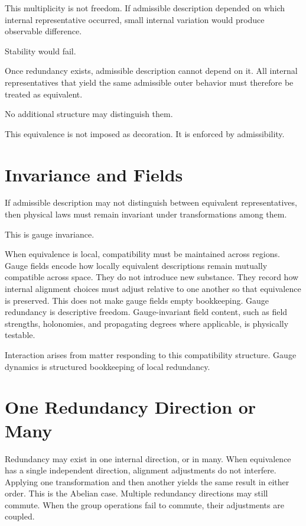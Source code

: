 \documentclass[11pt,twoside,openright]{book}
\begin{document}
This multiplicity is not freedom. If admissible description depended on which internal representative occurred, small internal variation would produce observable difference.

Stability would fail.

Once redundancy exists, admissible description cannot depend on it. All internal representatives that yield the same admissible outer behavior must therefore be treated as equivalent.

No additional structure may distinguish them.

This equivalence is not imposed as decoration. It is enforced by admissibility.

\section*{Invariance and Fields}

If admissible description may not distinguish between equivalent representatives, then physical laws must remain invariant under transformations among them.

This is gauge invariance.

When equivalence is local, compatibility must be maintained across regions. Gauge fields encode how locally equivalent descriptions remain mutually compatible across space. They do not introduce new substance. They record how internal alignment choices must adjust relative to one another so that equivalence is preserved. This does not make gauge fields empty bookkeeping. Gauge redundancy is descriptive freedom. Gauge-invariant field content, such as field strengths, holonomies, and propagating degrees where applicable, is physically testable.

Interaction arises from matter responding to this compatibility structure. Gauge dynamics is structured bookkeeping of local redundancy.

\section*{One Redundancy Direction or Many}

Redundancy may exist in one internal direction, or in many. When equivalence has a single independent direction, alignment adjustments do not interfere. Applying one transformation and then another yields the same result in either order. This is the Abelian case. Multiple redundancy directions may still commute. When the group operations fail to commute, their adjustments are coupled.
\end{document}
